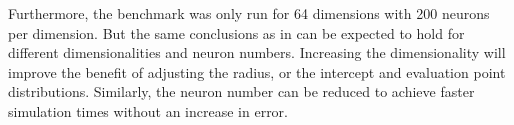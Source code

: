 
Furthermore, the benchmark was only run for 64 dimensions with \num{200} neurons per dimension.
But the same conclusions as in \textcite{gosmann216} can be expected to hold for different dimensionalities and neuron numbers.
Increasing the dimensionality will improve the benefit of adjusting the radius, or the intercept and evaluation point distributions.
Similarly, the neuron number can be reduced to achieve faster simulation times without an increase in error.
